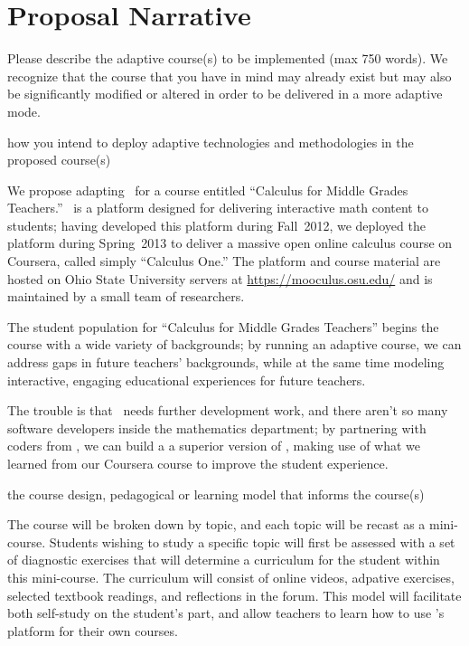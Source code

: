 \section{Proposal Narrative}


\begin{question}
Please describe the adaptive course(s) to be implemented (max 750
words). We recognize that the course that you have in mind may
already exist but may also be significantly modified or altered in
order to be delivered in a more adaptive mode.
\end{question}

\begin{subquestion} 
how you intend to deploy adaptive technologies and methodologies in
the proposed course(s)
\end{subquestion}

We propose adapting \mooculus\ for a course entitled ``Calculus for
Middle Grades Teachers.''  \mooculus\ is a platform designed for
delivering interactive math content to students; having developed this
platform during Fall~2012, we deployed the platform during Spring~2013
to deliver a massive open online calculus course on Coursera, called
simply ``Calculus One.''  The platform and course material are hosted
on Ohio State University servers at \url{https://mooculus.osu.edu/}
and is maintained by a small team of researchers.  

The student population for ``Calculus for Middle Grades Teachers''
begins the course with a wide variety of backgrounds; by running an
adaptive course, we can address gaps in future teachers' backgrounds,
while at the same time modeling interactive, engaging educational
experiences for future teachers.

The trouble is that \mooculus\ needs further development work, and
there aren't so many software developers inside the mathematics
department; by partnering with coders from \gratisu, we can build a a
superior version of \mooculus, making use of what we learned from our
Coursera course to improve the student experience.

\begin{subquestion}
 the course design, pedagogical or learning model that informs
 the course(s)
\end{subquestion}

The course will be broken down by topic, and each topic will be recast
as a mini-course.  Students wishing to study a specific topic will
first be assessed with a set of diagnostic exercises that will
determine a curriculum for the student within this mini-course.  The
curriculum will consist of online videos, adpative exercises, selected
textbook readings, and reflections in the forum.  This model will
facilitate both self-study on the student's part, and allow teachers
to learn how to use \gratisu's platform for their own courses.

